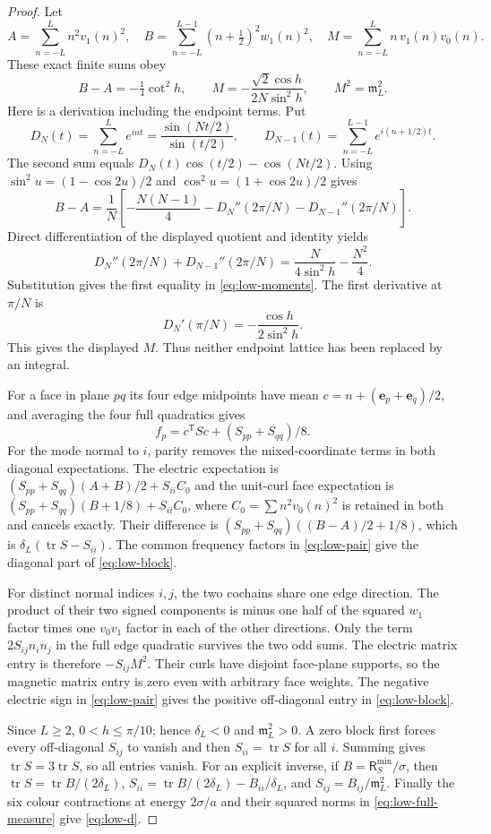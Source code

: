 \begin{proof}
Let
\[
 A=\sum_{n=-L}^Ln^2v_1(n)^2,\quad
 B=\sum_{n=-L}^{L-1}(n+\tfrac12)^2w_1(n)^2,\quad
 M=\sum_{n=-L}^Ln\,v_1(n)v_0(n).
\]
These exact finite sums obey
\begin{equation}\label{eq:low-moments}
 B-A=-\tfrac14\cot^2h,\qquad
 M=-\frac{\sqrt2\cos h}{2N\sin^2h},\qquad M^2=\mathfrak m_L^2.
\end{equation}
Here is a derivation including the endpoint terms. Put
\[
 D_N(t)=\sum_{n=-L}^Le^{int}=\frac{\sin(Nt/2)}{\sin(t/2)},
 \qquad D_{N-1}(t)=\sum_{n=-L}^{L-1}e^{i(n+1/2)t}.
\]
The second sum equals
$D_N(t)\cos(t/2)-\cos(Nt/2)$.
Using $\sin^2u=(1-\cos2u)/2$ and $\cos^2u=(1+\cos2u)/2$ gives
\[
 B-A=\frac1N\left[
 -\frac{N(N-1)}4-D_N''(2\pi/N)-D_{N-1}''(2\pi/N)\right].
\]
Direct differentiation of the displayed quotient and identity yields
\[
 D_N''(2\pi/N)+D_{N-1}''(2\pi/N)
 =\frac{N}{4\sin^2h}-\frac{N^2}4.
\]
Substitution gives the first equality in \eqref{eq:low-moments}.
The first derivative at $\pi/N$ is
\[
 D_N'(\pi/N)=-\frac{\cos h}{2\sin^2h}.
\]
This gives the displayed $M$.
Thus neither endpoint lattice has been replaced by an integral.

For a face in plane $pq$ its four edge midpoints have mean
$c=n+(\mathbf e_p+\mathbf e_q)/2$, and averaging the four full
quadratics gives
\[
 f_p=c^{\mathsf T}S c+(S_{pp}+S_{qq})/8 .
\]
For the mode normal to $i$, parity removes the mixed-coordinate terms
in both diagonal expectations. The electric expectation is
$(S_{pp}+S_{qq})(A+B)/2+S_{ii}C_0$ and the unit-curl face expectation
is $(S_{pp}+S_{qq})(B+1/8)+S_{ii}C_0$, where
$C_0=\sum n^2v_0(n)^2$ is retained in both and cancels exactly.
Their difference is
$(S_{pp}+S_{qq})((B-A)/2+1/8)$, which is
$\delta_L(\operatorname{tr}S-S_{ii})$.
The common frequency factors in \eqref{eq:low-pair} give the diagonal
part of \eqref{eq:low-block}.

For distinct normal indices $i,j$, the two cochains share one edge
direction. The product of their two signed components is minus one half
of the squared $w_1$ factor times one $v_0v_1$ factor in each of
the other directions. Only the term $2S_{ij}n_in_j$ in the full
edge quadratic survives the two odd sums. The electric matrix entry
is therefore $-S_{ij}M^2$. Their curls have disjoint face-plane
supports, so the magnetic matrix entry is zero even with arbitrary
face weights. The negative electric sign in \eqref{eq:low-pair}
gives the positive off-diagonal entry in \eqref{eq:low-block}.

Since $L\ge2$, $0<h\le\pi/10$; hence $\delta_L<0$ and
$\mathfrak m_L^2>0$. A zero block first forces every off-diagonal
$S_{ij}$ to vanish and then $S_{ii}=\operatorname{tr}S$ for all $i$.
Summing gives $\operatorname{tr}S=3\operatorname{tr}S$, so all entries
vanish. For an explicit inverse, if $B=\mathsf R_S^{\min}/\sigma$,
then
$\operatorname{tr}S=\operatorname{tr}B/(2\delta_L)$,
$S_{ii}=\operatorname{tr}B/(2\delta_L)-B_{ii}/\delta_L$, and
$S_{ij}=B_{ij}/\mathfrak m_L^2$.
Finally the six colour contractions at energy $2\sigma/a$ and their
squared norms in \eqref{eq:low-full-measure} give \eqref{eq:low-d}.
\end{proof}

